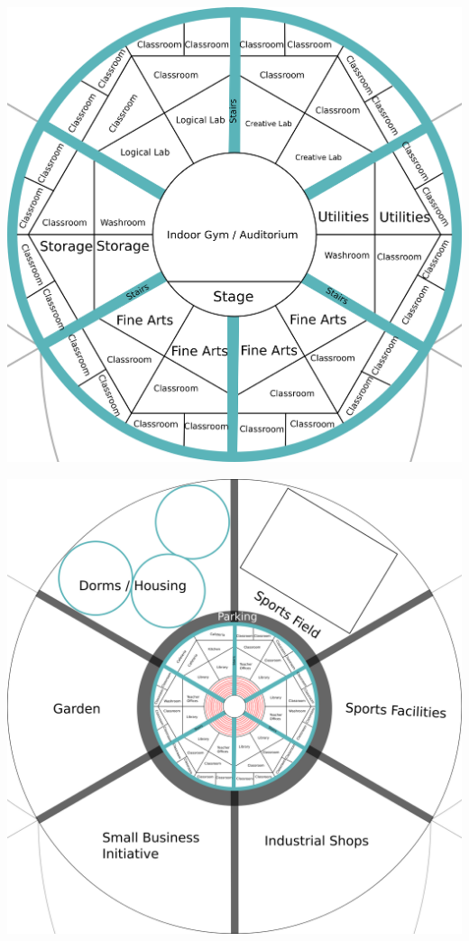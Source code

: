 \documentclass[CSHFoundation.tex]{subfiles}
\begin{document}
\centerline{\includegraphics[scale=0.04]{6-community centre floor 0.png}}
\centerline{\includegraphics[scale=0.04]{6-community centre floor 1.png}}
\end{document}
